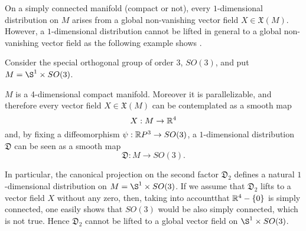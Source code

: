 On a simply connected manifold (compact or not), every $1$-dimensional distribution on $M$ arises from a global non-vanishing vector field $X\in \mathfrak{X}(M)$. However, a $1$-dimensional distribution cannot be lifted in general to a global non-vanishing vector field as the following example shows \cite{greub72}.


\vspace{2mm}


Consider the special orthogonal group of order 3, $SO(3)$, and put $M=\S^{1}\times SO(3)$.

$M$ is a 4-dimensional compact manifold. Moreover it is parallelizable, and therefore every vector field $X\in\mathfrak{X}(M)$ can be contemplated as a smooth map $$X:M\rightarrow \mathbb{R}^{4}$$ and, by fixing a diffeomorphism $\psi:\mathbb{R} P^{3}\rightarrow SO(3)$, a $1$-dimensional distribution $\mathfrak{D}$ can be seen as a smooth map $$\mathfrak{D}:M\rightarrow SO(3).$$


In particular, the canonical projection on the second factor $\mathfrak{D}_2$ defines a natural $1$-dimensional distribution on $M=\S^{1}\times SO(3)$. If we assume that $\mathfrak{D}_2$ lifts to a vector field $X$ without any zero, then, taking into accountthat $\mathbb{R}^{4}-\{0\}$ is simply connected, one easily shows that $SO(3)$ would be also simply connected, which is not true. Hence $\mathfrak{D}_2$ cannot be lifted to a global vector field on $\S^{1}\times SO(3)$.
